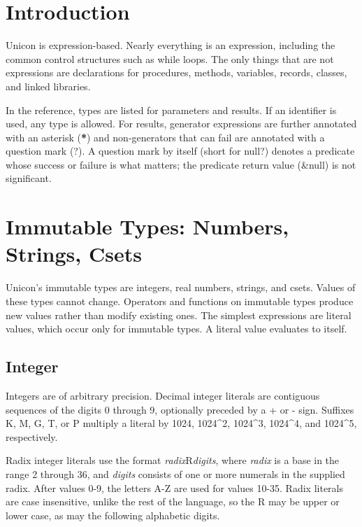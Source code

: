 \section{Introduction}		%

Unicon is expression-based. Nearly everything is an expression,
including the common control structures such
as while loops. The only things that are not expressions are
declarations for procedures, methods, variables, records, classes, and
linked libraries.

In the reference, types are listed for parameters and results. If an
identifier is used, any type is allowed. For results,
generator expressions are further annotated with an
asterisk (\textsf{\textbf{*}}) and non-generators that can
fail are annotated with a question mark
(\textsf{?}). A question mark by itself (short for \textsf{null?})
denotes a predicate whose success or failure is what matters; the
predicate return value (\textsf{\&null}) is not significant.

\section{Immutable Types: Numbers, Strings, Csets}

Unicon's immutable types are integers, real numbers,
strings, and csets. Values of these types cannot change. Operators and
functions on immutable types produce new values rather than modify
existing ones. The simplest expressions are literal values, which occur
only for immutable types. A literal value evaluates to itself.

\subsection*{Integer}

Integers are of arbitrary precision. Decimal integer
literals are contiguous sequences of the digits 0 through 9, optionally
preceded by a + or - sign.  Suffixes K, M, G, T, or P multiply
a literal by 1024, 1024\^{}2, 1024\^{}3, 1024\^{}4, and
1024\^{}5, respectively.

Radix integer literals use the format
\textit{radix}R\textit{digits}, where \textit{radix} is a base in the
range 2 through 36, and \textit{digits} consists of one or more
numerals in the supplied radix. After values 0-9, the letters A-Z are
used for values 10-35. Radix literals are case insensitive, unlike the
rest of the language, so the R may be upper or lower case, as may the
following alphabetic digits.

